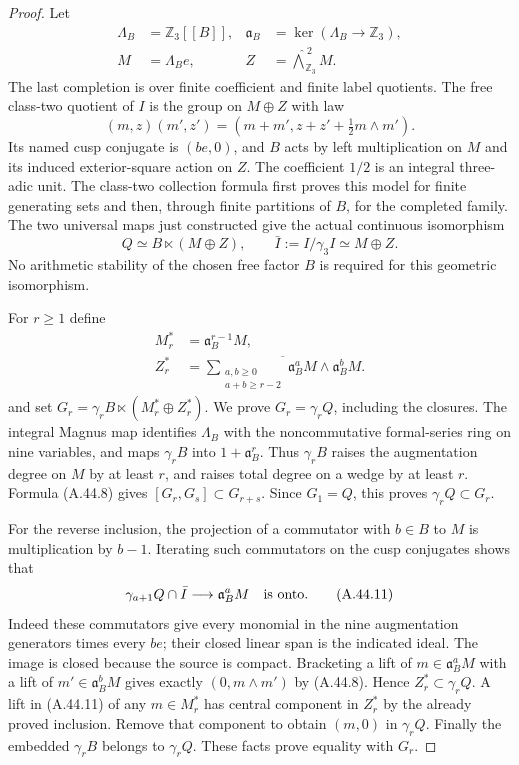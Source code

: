 \begin{proof}
Let
\[
\begin{aligned}
 \Lambda_B&=\mathbb Z_3[[B]],&
 \mathfrak a_B&=\ker(\Lambda_B\to\mathbb Z_3),\\
 M&=\Lambda_B e,&
 Z&=\widehat{\bigwedge}^{\,2}_{\mathbb Z_3}M.
\end{aligned}
 \tag{A.44.7}
\]
The last completion is over finite coefficient and
finite label quotients. The free class-two quotient
of $I$ is the group on $M\oplus Z$ with law
\[
 (m,z)(m',z')=
       (m+m',z+z'+\tfrac12m\wedge m').
 \tag{A.44.8}
\]
Its named cusp conjugate is $(be,0)$, and $B$ acts
by left multiplication on $M$ and its induced
exterior-square action on $Z$. The coefficient
$1/2$ is an integral three-adic unit. The class-two
collection formula first proves this model for
finite generating sets and then, through finite
partitions of $B$, for the completed family.
The two universal maps just constructed give the
actual continuous isomorphism
\[
       Q\simeq B\ltimes(M\oplus Z),\qquad
       \bar I:=I/\gamma_3I\simeq M\oplus Z.
 \tag{A.44.9}
\]
No arithmetic stability of the chosen free factor
$B$ is required for this geometric isomorphism.

For $r\ge1$ define
\[
\begin{aligned}
 M_r^*&=\mathfrak a_B^{r-1}M,\\
 Z_r^*&=\overline{\sum_{\substack{a,b\ge0\\a+b\ge r-2}}
               \mathfrak a_B^aM\wedge\mathfrak a_B^bM}.
\end{aligned}
 \tag{A.44.10}
\]
and set $G_r=\gamma_rB\ltimes(M_r^*\oplus Z_r^*)$.
We prove $G_r=\gamma_rQ$, including the closures.
The integral Magnus map identifies
$\Lambda_B$ with the noncommutative formal-series
ring on nine variables, and maps
$\gamma_rB$ into $1+\mathfrak a_B^r$.
Thus $\gamma_rB$ raises the augmentation degree
on $M$ by at least $r$, and raises total degree
on a wedge by at least $r$. Formula (A.44.8)
gives $[G_r,G_s]\subset G_{r+s}$. Since $G_1=Q$,
this proves $\gamma_rQ\subset G_r$.

For the reverse inclusion, the projection of a
commutator with $b\in B$ to $M$ is multiplication
by $b-1$. Iterating such commutators on the cusp
conjugates shows that
\[
       \gamma_{a+1}Q\cap\bar I\longrightarrow
                     \mathfrak a_B^aM
 \quad\hbox{is onto}.
 \tag{A.44.11}
\]
Indeed these commutators give every monomial in
the nine augmentation generators times every
$be$; their closed linear span is the indicated
ideal. The image is closed because the source
is compact. Bracketing a lift of
$m\in\mathfrak a_B^aM$ with a lift of
$m'\in\mathfrak a_B^bM$ gives exactly
$(0,m\wedge m')$ by (A.44.8). Hence
$Z_r^*\subset\gamma_rQ$. A lift in (A.44.11)
of any $m\in M_r^*$ has central component in
$Z_r^*$ by the already proved inclusion.
Remove that component to obtain $(m,0)$ in
$\gamma_rQ$. Finally the embedded
$\gamma_rB$ belongs to $\gamma_rQ$.
These facts prove equality with $G_r$.


\end{proof}
